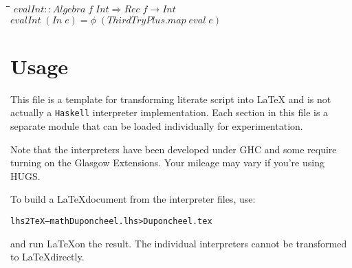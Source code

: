 \documentclass[10pt]{article}
\newlength{\lwidth}\setlength{\lwidth}{4.5cm}
\newlength{\cwidth}\setlength{\cwidth}{8mm} %
\newcommand{\Conid}[1]{\mathit{#1}}
\newcommand{\Varid}[1]{\mathit{#1}}
\begin{document}
\begin{tabbing}
\qquad\=\hspace{\lwidth}\=\hspace{\cwidth}\=\+\kill
${\Varid{evalInt}\mathbin{::}\Conid{Algebra}\;\Varid{f}\;\Conid{Int}\Rightarrow \Conid{Rec}\;\Varid{f}\to \Conid{Int}}$\\
${\Varid{evalInt}\;(\Conid{In}\;\Varid{e})\mathrel{=}\Varid{\phi}\;(\Varid{\Conid{ThirdTryPlus}.map}\;\Varid{eval}\;\Varid{e})}$
\end{tabbing}
\section{Usage}

This file is a template for transforming literate script into \LaTeX
and is not actually a \texttt{Haskell} interpreter implementation.
Each section in this file is a separate module that can be loaded
individually for experimentation.


Note that the interpreters have been developed under GHC and some
require turning on the Glasgow Extensions.  Your mileage may vary if
you're using HUGS.

To build a \LaTeX document from the interpreter files, use:

\begin{alltt}
   lhs2TeX --math Duponcheel.lhs > Duponcheel.tex
\end{alltt}

and run \LaTeX on the result.  The individual interpreters cannot be
transformed to \LaTeX directly.
\end{document}
